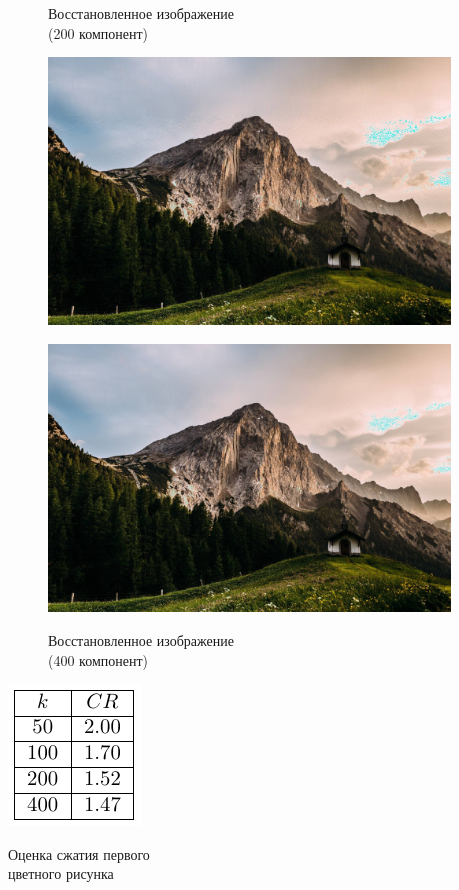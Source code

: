 \documentclass[a4paper]{article}
\begin{document}
\begin{figure}[H]
\centering
    \begin{minipage}{.45\textwidth}
    \caption{Восстановленное изображение \\(200 компонент)}
    \includegraphics[width = 0.95\textwidth]{reconstructions/with_200comps_Austria.jpg}
    \label{fig:aus_200}
    \end{minipage}%
    \begin{minipage}{.45\textwidth}
      \centering
    \caption{Восстановленное изображение \\(400 компонент)}
    \includegraphics[width = 0.95\textwidth]{reconstructions/with_400comps_Austria.jpg}
    \label{fig:aus_400}
    \end{minipage}%
\end{figure}
\begin{table}[H]
    \centering
    \includegraphics[]{tables/CR_for_Austria.pdf}
    \caption{Оценка сжатия первого\\цветного рисунка}
    \label{tab:aus}
\end{table}
\end{document}
